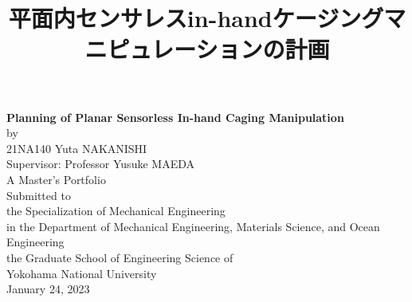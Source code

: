 \documentclass[a4paper,twoside,12pt,papersize, dvipdfmx]{iirthesis}
\begin{document}
%

 \pagestyle{empty}		%
 \title{\Huge{平面内センサレスin-handケージングマニピュレーションの計画}}
 \etitle{}
 \author{}
 \eauthor{}
 \maketitle

\pagestyle{empty}
\cleardoublepage
\begin{center}
    \vspace{12em}
    \Large
{\sffamily \bfseries \huge{Planning of Planar Sensorless In-hand Caging Manipulation}}\\
    \vspace{2em}
    {\LARGE by}\\
    \vspace{2em}
    {\LARGE 21NA140 Yuta NAKANISHI}\\
    \vspace{9em}
    Supervisor: Professor Yusuke MAEDA\\
    \vspace{2em}
    A Master's Portfolio\\
    Submitted to\\
    the Specialization of Mechanical Engineering\\
    in the Department of Mechanical Engineering, Materials Science, and Ocean Engineering\\
    the Graduate School of Engineering Science of\\
    Yokohama National University\\
    \vspace{3em}
    January 24, 2023
\end{center}

\cleardoublepage	%
\end{document}
